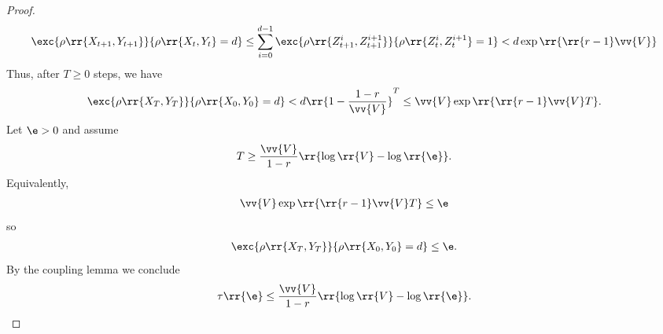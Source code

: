 \documentclass{article}
\begin{document}
\begin{claim*}[5]
\begin{proof}
    \begin{align*}
      \exc{\rho\rr{X_{t+1},Y_{t+1}}}{\rho\rr{X_t,Y_t}=d} \leq \sum_{i=0}^{d-1}\exc{\rho\rr{Z_{t+1}^i,Z_{t+1}^{i+1}}}{\rho\rr{Z_t^i,Z_t^{i+1}}=1} < d\exp\rr{\rr{r-1}\vv{V}}
    \end{align*}
    Thus, after $T\geq 0$ steps, we have
    \begin{align*}
      \exc{\rho\rr{X_T,Y_T}}{\rho\rr{X_0,Y_0}=d} < d\rr{1-\frac{1-r}{\vv{V}}}^T \leq \vv{V}\exp\rr{\rr{r-1}\vv{V}T}.
    \end{align*}
    Let $\e>0$ and assume
    \begin{align*}
      T \geq \frac{\vv{V}}{1-r}\rr{\log\rr{V}-\log\rr{\e}}.
    \end{align*}
    Equivalently,
    \begin{align*}
      \vv{V}\exp\rr{\rr{r-1}\vv{V}T} \leq \e
    \end{align*}
    so
    \begin{align*}
      \exc{\rho\rr{X_T,Y_T}}{\rho\rr{X_0,Y_0}=d} \leq \e.
    \end{align*}
    By the coupling lemma we conclude
    \begin{align*}
      \tau\rr{\e}\leq \frac{\vv{V}}{1-r}\rr{\log\rr{V}-\log\rr{\e}}.
    \end{align*}
  \end{proof}
\end{claim*}
\end{document}
